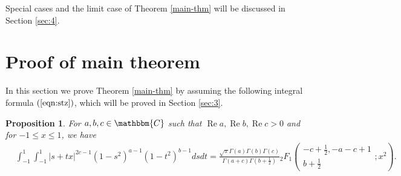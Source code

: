 \documentclass[12pt]{article}
\numberwithin{equation}{section}
\newcommand{\tmop}[1]{\ensuremath{\operatorname{#1}}}
\newtheorem{proposition}[corollary]{Proposition}
{\theorembodyfont{\rmfamily}\newtheorem{remark}[corollary]{Remark}}
\begin{document}
Special cases and the limit case of Theorem \ref{main-thm} will be discussed
in Section \ref{sec:4}.

\section{Proof of main theorem}\label{sec:2}

In this section we prove Theorem \ref{main-thm} by assuming the following
integral formula $(\ref{eqn:stz})$, which will be proved in Section
\ref{sec:3}.

\begin{proposition}
  \label{prop:2}For $a, b, c \in \mathbbm{C}$ such that $\tmop{Re} a,
  \tmop{Re} b, \tmop{Re} c > 0$ and for $- 1 \leqslant x \leqslant 1$, we have
  \begin{eqnarray}
    & \displaystyle\int_{- 1}^1 \displaystyle\int_{- 1}^1 | s + t x |^{2 c - 1} (1 - s^2)^{a - 1} (1 -
    t^2)^{b - 1} d s d t = \frac{\sqrt{\pi} \Gamma (a) \Gamma (b) \Gamma
    (c)}{\Gamma (a + c) \Gamma \left( b + \frac{1}{2} \right)}{}_2 F_1 \left(
    \begin{array}{c}
      - c + \frac{1}{2}, - a - c + 1\\
      b + \frac{1}{2}
    \end{array} ; x^2 \right) .  \label{eqn:stz} & \\
    &  &  \nonumber
  \end{eqnarray}
\end{proposition}
\end{document}
